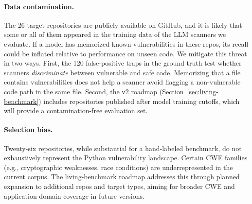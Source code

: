 \paragraph{Data contamination.}
The 26 target repositories are publicly available on GitHub, and it is
likely that some or all of them appeared in the training data of the LLM
scanners we evaluate.  If a model has memorized known vulnerabilities in
these repos, its recall could be inflated relative to performance on
unseen code.  We mitigate this threat in two ways.  First, the 120
false-positive traps in the ground truth test whether scanners
\emph{discriminate} between vulnerable and safe code. Memorizing that a
file contains vulnerabilities does not help a scanner avoid flagging a
non-vulnerable code path in the same file.  Second, the v2 roadmap
(Section~\ref{sec:living-benchmark}) includes repositories published
after model training cutoffs, which will provide a contamination-free
evaluation set.

\paragraph{Selection bias.}
Twenty-six repositories, while substantial for a hand-labeled benchmark,
do not exhaustively represent the Python vulnerability landscape.
Certain CWE families (e.g., cryptographic weaknesses, race conditions)
are underrepresented in the current corpus.  The living-benchmark
roadmap addresses this through planned expansion to additional repos
and target types, aiming for broader CWE and application-domain
coverage in future versions.
